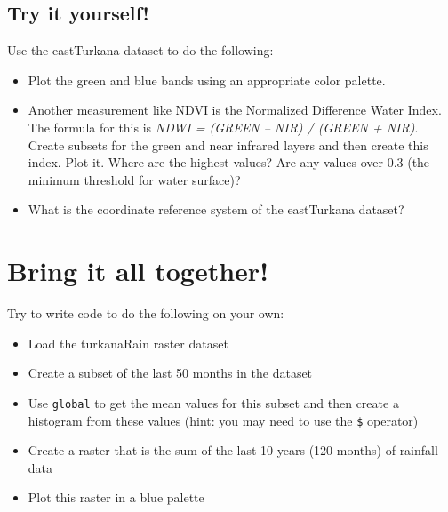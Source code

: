 \documentclass[
]{book}
\providecommand{\tightlist}{%
  \setlength{\itemsep}{0pt}\setlength{\parskip}{0pt}}
\begin{document}
\hypertarget{try-it-yourself-1}{%
\section{Try it yourself!}\label{try-it-yourself-1}}

Use the eastTurkana dataset to do the following:

\begin{itemize}
\tightlist
\item
  Plot the green and blue bands using an appropriate color palette.
\item
  Another measurement like NDVI is the Normalized Difference Water Index. The formula for this is \emph{NDWI = (GREEN -- NIR) / (GREEN + NIR)}. Create subsets for the green and near infrared layers and then create this index. Plot it. Where are the highest values? Are any values over 0.3 (the minimum threshold for water surface)?
\item
  What is the coordinate reference system of the eastTurkana dataset?
\end{itemize}

\hypertarget{bring-it-all-together}{%
\chapter{Bring it all together!}\label{bring-it-all-together}}

Try to write code to do the following on your own:

\begin{itemize}
\tightlist
\item
  Load the turkanaRain raster dataset
\item
  Create a subset of the last 50 months in the dataset
\item
  Use \texttt{global} to get the mean values for this subset and then create a histogram from these values (hint: you may need to use the \texttt{\$} operator)
\item
  Create a raster that is the sum of the last 10 years (120 months) of rainfall data
\item
  Plot this raster in a blue palette
\end{itemize}

  
\end{document}
